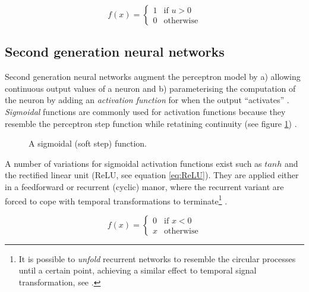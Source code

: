 \documentclass[report.tex]{subfiles}
\begin{document}
\begin{equation} \label{eq:perceptron}
f(x) = \begin{cases}
	 1 & \text{if } u > 0\\
	 0 & \text{otherwise}
       \end{cases}
\end{equation}

\subsection{Second generation neural networks}
Second generation neural networks augment the perceptron model by
a) allowing continuous output values of a neuron and b) parameterising
the computation of the neuron by adding an \textit{activation function}
 for when the output ``activates'' 
\cite{Maass1997}.
\textit{Sigmoidal} functions are commonly used for activation functions
because they resemble the perceptron step function while 
retatining continuity (see figure \ref{fig:sigmoid})
\cite{Maass1997}.

\begin{figure}
\centering
{}
\caption{A sigmoidal (soft step) function.}
\label{fig:sigmoid}
\end{figure}

A number of variations for sigmoidal activation functions exist such as $tanh$ and
the rectified linear unit  (ReLU, see equation \ref{eq:ReLU}). 
They are applied either in a feedforward or recurrent (cyclic) manor, where
the recurrent variant are forced to cope with temporal transformations to
terminate\footnote{It is possible to \textit{unfold} recurrent
networks to resemble the circular processes until a certain point, achieving
a similar effect to temporal signal transformation, see \cite{Mozer1995}.}
\cite{Schmidhuber2014}.

\begin{equation} \label{eq:ReLU}
f(x) = \begin{cases}
         0 & \text{if } x < 0 \\
	 x & \text{otherwise}
       \end{cases}
\end{equation}
\end{document}
